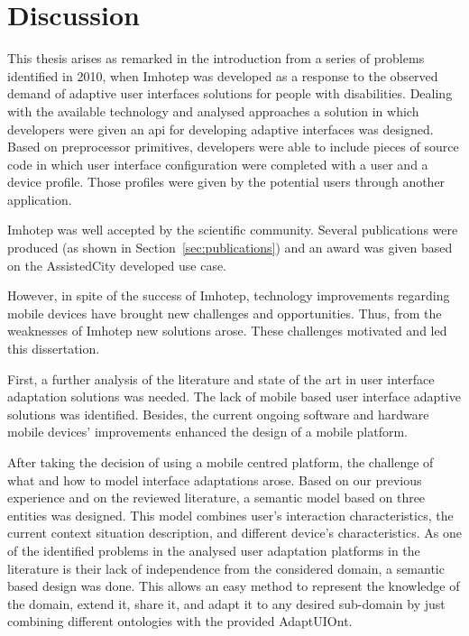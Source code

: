 \section{Discussion}
\label{sec:discussion}

This thesis arises as remarked in the introduction from a series of problems 
identified in 2010, when Imhotep was developed as a response to the observed 
demand of adaptive user interfaces solutions for people with disabilities. 
Dealing with the available technology and analysed approaches a solution in which 
developers were given an \ac{api} for developing adaptive interfaces was designed. 
Based on preprocessor primitives, developers were able to include pieces of source 
code in which user interface configuration were completed with a user and a device 
profile. Those profiles were given by the potential users through another 
application.

Imhotep was well accepted by the scientific community. Several publications
were produced (as shown in Section~\ref{sec:publications}) and an award was 
given based on the AssistedCity developed use case.

However, in spite of the success of Imhotep, technology improvements regarding
mobile devices have brought new challenges and opportunities. Thus, from the 
weaknesses of Imhotep new solutions arose. These challenges motivated and led
this dissertation.


First, a further analysis of the literature and state of the art in user 
interface adaptation solutions was needed. The lack of mobile based user 
interface adaptive solutions was identified. Besides, the current ongoing 
software and hardware mobile devices' improvements enhanced the design of a 
mobile platform.

After taking the decision of using a mobile centred platform, the challenge of
what and how to model interface adaptations arose. Based on our previous 
experience and on the reviewed literature, a semantic model based on three 
entities was designed. This model combines user's interaction characteristics, 
the current context situation description, and different device's characteristics. 
As one of the identified problems in the analysed user adaptation platforms in 
the literature is their lack of independence from the considered domain, a 
semantic based design was done. This allows an easy method to represent the 
knowledge of the domain, extend it, share it, and adapt it to any desired 
sub-domain by just combining different ontologies with the provided AdaptUIOnt.

